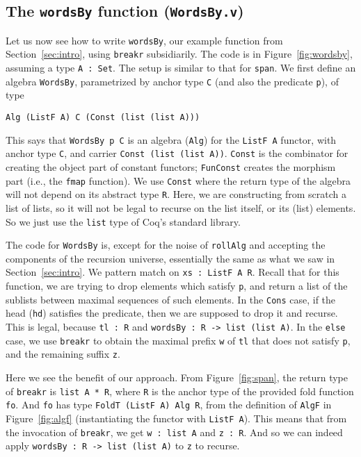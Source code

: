 \documentclass[a4paper,USenglish]{lipics-v2021}
\begin{document}
\subsection{The \texttt{wordsBy} function (\texttt{WordsBy.v})}

Let us now see how to write \verb|wordsBy|, our example function from
Section~\ref{sec:intro}, using \verb|breakr| subsidiarily.
The code is in Figure~\ref{fig:wordsby}, assuming a type
\verb|A : Set|.  The setup is similar to that for \verb|span|.  We first define
an algebra \verb|WordsBy|, parametrized by anchor type \verb|C| (and also
the predicate \verb|p|), of type
\begin{verbatim}
Alg (ListF A) C (Const (list (list A)))
\end{verbatim}
\noindent This says that \verb|WordsBy p C| is an algebra (\verb|Alg|)
for the \verb|ListF A| functor, with anchor type \verb|C|, and carrier
\verb|Const (list (list A))|.  \verb|Const| is the combinator for
creating the object part of constant functors; \verb|FunConst| creates
the morphism part (i.e., the \verb|fmap| function).  We use 
\verb|Const| where the return type of the
algebra will not depend on its abstract type \verb|R|.  Here, we are
constructing from scratch a list of lists, so it will not be legal to
recurse on the list itself, or its (list) elements.  So we just
use the \verb|list| type of Coq's standard library.

The code for \verb|WordsBy| is, except for the noise of \verb|rollAlg|
and accepting the components of the recursion universe, essentially
the same as what we saw in Section~\ref{sec:intro}.  We pattern match
on \verb|xs : ListF A R|.  Recall that for this function, we are
trying to drop elements which satisfy \verb|p|, and return a list of
the sublists between maximal sequences of such elements.  In the
\verb|Cons| case, if the head (\verb|hd|) satisfies the predicate, then we are
supposed to drop it and recurse.  This is legal, because \verb|tl : R|
and \verb|wordsBy : R -> list (list A)|.  In the \verb|else| case,
we use \verb|breakr| to obtain the maximal prefix \verb|w| of \verb|tl| that
does not satisfy \verb|p|, and the remaining suffix \verb|z|.

Here we see the benefit of our approach.  From Figure~\ref{fig:span},
the return type of \verb|breakr| is \verb|list A * R|, where \verb|R|
is the anchor type of the provided fold function \verb|fo|.  And
\verb|fo| has type \verb|FoldT (ListF A) Alg R|, from the definition
of \verb|AlgF| in Figure~\ref{fig:algf} (instantiating the functor
with \verb|ListF A|).  This means that from the invocation of
\verb|breakr|, we get \verb|w : list A| and \verb|z : R|.  And so we
can indeed apply \verb|wordsBy : R -> list (list A)| to
\verb|z| to recurse.
\end{document}
